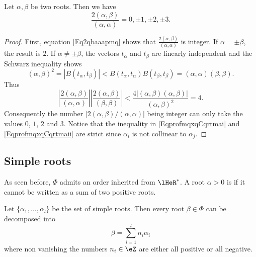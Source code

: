 \begin{proposition}
    Let \( \alpha,\beta\) be two roots. Then we have
    \begin{equation}
        \frac{2(\alpha,\beta)}{(\alpha,\alpha)}=0,\pm 1,\pm 2,\pm 3.
    \end{equation}
\end{proposition}

\begin{proof}
    First, equation \eqref{Eq2qbaaapmq} shows that \( \frac{2(\alpha,\beta)}{(\alpha,\alpha)}\) is integer. If \( \alpha=\pm\beta\), the result is \( 2\). If \( \alpha\neq\pm\beta\), the vectors \( t_{\alpha}\) and \( t_{\beta}\) are linearly independent and the Schwarz inequality shows
    \begin{equation}        \label{EqprofmqxqCqrtmai}
        (\alpha,\beta)^2=| B(t_{\alpha},t_{\beta}) |< B(t_{\alpha},t_{\alpha})B(t_{\beta},t_{\beta})=(\alpha,\alpha)(\beta,\beta).
    \end{equation}
    Thus
    \begin{equation}        \label{EqprofmqxqCqrtmaii}
        \left| \frac{2(\alpha,\beta)}{(\alpha,\alpha)} \right| \left| \frac{2(\alpha,\beta)}{(\beta,\beta)} \right| <\frac{ 4| (\alpha,\beta)(\alpha,\beta) | }{ (\alpha,\beta)^2 }=4.
    \end{equation}
    Consequently the number \( | 2(\alpha,\beta)/(\alpha,\alpha) |\) being integer can only take the values \( 0\), \( 1\), \( 2\) and \( 3\). Notice that the inequality in \eqref{EqprofmqxqCqrtmai} and \eqref{EqprofmqxqCqrtmaii} are strict since \( \alpha_i\) is not collinear to \( \alpha_j\).
\end{proof}

\subsection{Simple roots}
As seen before, $\Phi$ admits an order inherited from $\lHeR^*$. A root $\alpha>0$ is  if it cannot be written as a sum of two positive roots.

\begin{theorem}      \label{ThoposrootnjajnZ}
    Let \( \{ \alpha_1,\ldots,\alpha_l \}\) be the set of simple roots. Then every root \( \beta\in\Phi\) can be decomposed into
    \begin{equation}
        \beta=\sum_{i=1}^ln_i\alpha_i
    \end{equation}
    where non vanishing the numbers \( n_i\in\eZ\) are either all positive or all negative.
\end{theorem}

